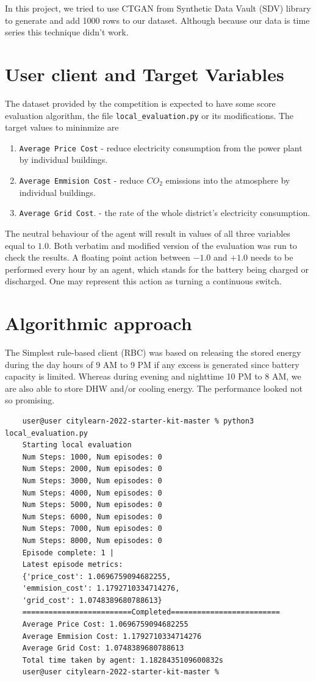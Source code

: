 \documentclass{article}
\numberwithin{equation}{subsection}
\begin{document}
In this project, we tried to use CTGAN from Synthetic Data Vault (SDV) library to generate and add 1000 rows to our dataset. Although because our data is time series this technique didn't work. 

\section{User client and Target Variables}

The dataset provided by the competition is expected to have some score evaluation algorithm, the file \verb!local_evaluation.py! or its modifications. The target values to mininmize are 
\begin{enumerate}
	\item \verb!Average Price Cost! - reduce electricity consumption from the power plant by individual buildings.
	\item \verb!Average Emmision Cost! - reduce $CO_2$ emissions into the atmosphere by individual buildings.
	\item \verb!Average Grid Cost!. - the rate of the whole district's electricity consumption.
\end{enumerate}

The neutral behaviour of the agent will result in values of all three variables equal to $1.0$. Both verbatim and modified version of the evaluation was run to check the results. A floating point action between $-1.0$ and $+1.0$ needs to be performed every hour by an agent, which stands for the battery being charged or discharged. One may represent this action as turning a continuous switch. 



\section{Algorithmic approach}

The Simplest rule-based client (RBC) was based on releasing the stored energy during the day hours of 9 AM to 9 PM if any excess is generated since battery capacity is limited. Whereas during evening and nighttime 10 PM to 8 AM, we are also able to store DHW and/or cooling energy. The performance looked not so promising. 

\begin{verbatim}
	user@user citylearn-2022-starter-kit-master % python3 local_evaluation.py 
	Starting local evaluation
	Num Steps: 1000, Num episodes: 0
	Num Steps: 2000, Num episodes: 0
	Num Steps: 3000, Num episodes: 0
	Num Steps: 4000, Num episodes: 0
	Num Steps: 5000, Num episodes: 0
	Num Steps: 6000, Num episodes: 0
	Num Steps: 7000, Num episodes: 0
	Num Steps: 8000, Num episodes: 0
	Episode complete: 1 | 
	Latest episode metrics: 
	{'price_cost': 1.0696759094682255, 
	'emmision_cost': 1.1792710334714276, 
	'grid_cost': 1.0748389680788613}
	=========================Completed=========================
	Average Price Cost: 1.0696759094682255
	Average Emmision Cost: 1.1792710334714276
	Average Grid Cost: 1.0748389680788613
	Total time taken by agent: 1.1828435109600832s
	user@user citylearn-2022-starter-kit-master % 
\end{verbatim}
\end{document}

